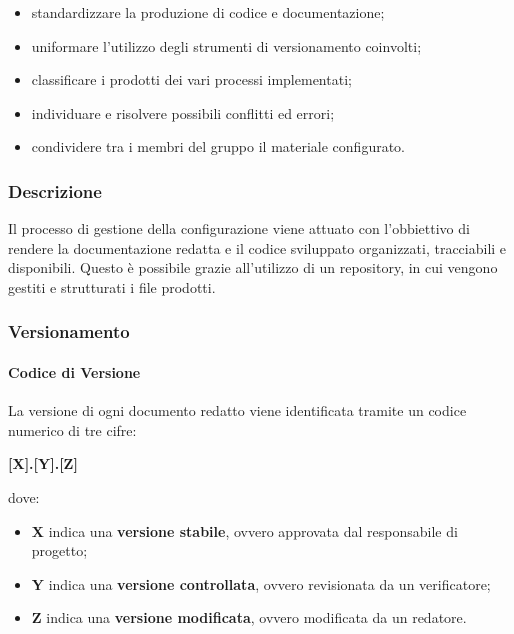 \begin{itemize}
    \item standardizzare la produzione di codice e documentazione;
    \item uniformare l’utilizzo degli strumenti di versionamento coinvolti;
    \item classificare i prodotti dei vari processi implementati;
    \item individuare e risolvere possibili conflitti ed errori;
    \item condividere tra i membri del gruppo il materiale configurato.
\end{itemize}

\subsubsection{Descrizione}
Il processo di gestione della configurazione viene attuato con l'obbiettivo di rendere la documentazione redatta e il codice sviluppato organizzati, tracciabili e disponibili.
Questo è possibile grazie all'utilizzo di un repository, in cui vengono gestiti e strutturati 
i file prodotti.

\subsubsection{Versionamento}
\paragraph{Codice di Versione}
La versione di ogni documento redatto viene identificata tramite un codice numerico di tre cifre:

\begin{center}
    \textbf{[X].[Y].[Z]}
\end{center}

dove:

\begin{itemize}
    \item \textbf{X} indica una \textbf{versione stabile}, ovvero approvata dal responsabile di progetto;
    \item \textbf{Y} indica una \textbf{versione controllata}, ovvero revisionata da un verificatore;
    \item \textbf{Z} indica una \textbf{versione modificata}, ovvero modificata da un redatore.
\end{itemize}

